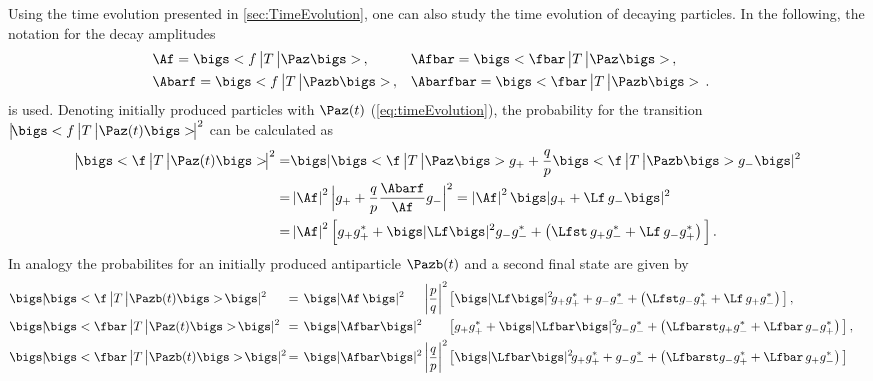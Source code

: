Using the time evolution presented in \cref{sec:TimeEvolution}, one can also study the time evolution of decaying particles.
In the following, the notation for the decay amplitudes
\begin{equation}
\begin{aligned}
&\Af = \bigs<f\,\big|T\,\big|\Paz\bigs>\,,&&\Afbar = \bigs<\fbar\,\big|T\,\big|\Paz\bigs>\,,&\\
&\Abarf = \bigs<f\,\big|T\,\big|\Pazb\bigs>\,,&&\Abarfbar = \bigs<\fbar\,\big|T\,\big|\Pazb\bigs>\,.&
\end{aligned}
\end{equation}
is used.
Denoting initially produced particles with $\Paz(t)$ (\cref{eq:timeEvolution}), the probability for the transition $\left|\!\bigs<{}f\,\big|T\,\big|\Paz(t)\bigs>\!\right|^2$ can be calculated as
\begin{align}
\left|\!\bigs<{}\f\,\big|T\,\big|\Paz(t)\bigs>\!\right|^2 =&
\bigs|\bigs<{}\f\,\big|T\,\big|\Paz\bigs>g_++\frac{q}{p}\bigs<{}\f\,\big|T\,\big|\Pazb\bigs>g_-\bigs|^2\nonumber\\
=&\left|\Af\right|^2\Big|g_+ + \frac{q}{p}\frac{\Abarf}{\Af} g_-\Big|^2=\left|\Af\right|^2\bigs|g_+ +\Lf\,g_-\bigs|^2\nonumber\\
=&\left|\Af\right|^2\Big[g_+g_+^*+\bigs|\Lf\bigs|^2g_-g_-^*+\left(\Lfst\,g_+g_-^* + \Lf\, g_-g_+^*\right)\Big]\,. \label{eq:ProbTransPtof}
\end{align}
In analogy the probabilites for an initially produced antiparticle $\Pazb(t)$ and a second final state \fbar are given by
\begin{align}
&\bigs|\!\bigs<{}\f\,\big|T\,\big|\Pazb(t)\bigs>\!\bigs|^2&\kern -8.5pt{=}
&\kern 4.0pt{\bigs|\Af\,\bigs|^2}&&\kern -8.5pt{\left|\frac{p}{q}\right|^2}& &\kern -9.0pt{\left[\bigs|\Lf\bigs|^2\!g_+g_+^*+g_-g_-^*+\left(\Lfst g_-g_+^* + \Lf\, g_+g_-^*\right){}\right]}\,,&\\
&\bigs|\!\bigs<{}\fbar\,\big|T\,\big|\Paz(t)\bigs>\!\bigs|^2&\kern -8.5pt{=}
&\kern 4.0pt{\bigs|\Afbar\bigs|^2}& && &\kern -9.0pt{\left[g_+g_+^*+\bigs|\Lfbar\bigs|^2\!g_-g_-^*+\left(\Lfbarst g_+g_-^* + \Lfbar\, g_-g_+^*\right){}\right]}\,,&\\
&\bigs|\!\bigs<{}\fbar\,\big|T\,\big|\Pazb(t)\bigs>\!\bigs|^2&\kern -8.5pt{=}
&\kern 4.0pt{\bigs|\Afbar\bigs|^2}& &\kern -8.5pt{\left|\frac{q}{p}\right|^2}& &\kern -9.0pt{\left[\bigs|\Lfbar\bigs|^2\!g_+g_+^*+g_-g_-^*+\left(\Lfbarst g_-g_+^* + \Lfbar\, g_+g_-^*\right){}\right]}&\label{eq:ProbTransPbartofbar}
\end{align}
